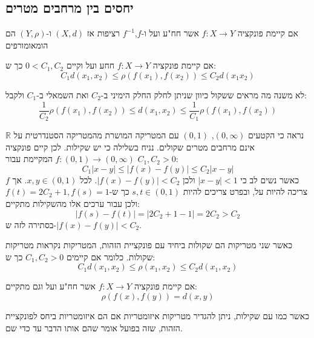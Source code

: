 \documentclass{tstextbook}
\begin{document}
\subsection{יחסים בין מרחבים מטרים}

\begin{definition}[הומאומורפיזם]
אם קיימת פונקציה \(f:X\to Y\) אשר חח"ע ועל ו-\(f\),\(f^{-1}\) רציפות אז \((X,d)\) ו-\((Y,\rho)\) הם הומאומורפים

\end{definition}
\begin{definition}[שקילות]
אם קיימת פונקציה \(f:X\to Y\) חחע ועל וקיים \(0<C_{1},C_{2}\) כך ש:
$$C_{1}d(x_{1},x_{2})\leq \rho(f(x_{1}),f(x_{2}))\leq C_{2}d(x_{1}x_{2})
$$

\end{definition}
\begin{remark}
לא משנה מה מראים ששקול כיוון שניתן לחלק החלק הימיני ב-\(C_{2}\) ואת השמאלי ב-\(C_{1}\) ולקבל:
$$\frac{1}{C_{2}}\rho(f(x_{1}),f(x_{2}))\leq d(x_{1},x_{2})\leq \frac{1}{C_{1}}\rho(f(x_{1}),f(x_{2}))$$

\end{remark}
\begin{example}
נראה כי הקטעים \(\left( 0,\infty \right)\), \((0,1)\) עם המטריקה המושרת מהמטריקה הסטנדרטית על \(\mathbb{R}\) אינם מרחבים מטרים שקולים. נניח בשלילה כי יש שקילות. לכן קיים פונקציה \(f:(0,1)\to\left( 0,\infty \right)\) המקיימת עבור \(C_{1},C_{2}>0\):
$$C_{1}|x-y|\leq|f(x)-f(y)|\leq C_{2}|x-y|$$
כאשר נשים לב כי \(|x-y|<1\) ולכן \(|f(x)-f(y)|<C_{2}\). לכל \(x,y\in(0,1)\). אך \(f\) צריכה להיות על, ובפרט צריכים להיות \(s,t\in(0,1)\) כך ש-\(f(t)=2C_{2}+1,f(s)=1\) ולכן עבור ערכים אלו מהשקילות מתקיים:
$$|f(s)-f(t)|=|2C_{2}+1-1|=2C_{2}>C_{2}$$
בסתירה לזה ש-\(|f(x)-f(y)|<C_{2}\).

\end{example}
\begin{definition}
כאשר שני מטריקות הם שקולות ביחיד עם פונקציית הזהות, המטריקות נקראות מטריקות שקולות. כלומר אם קיימים \(C_{1},C_{2}>0\) כך ש:
$$C_{1}d(x_{1},x_{2})\leq \rho(x_{1},x_{2})\leq C_{2}d(x_{1},x_{2})$$

\end{definition}
\begin{definition}[איזומטריה]
אם קיימת פונקציה \(f:X\to Y\) אשר חח"ע ועל וגם מתקיים:
$$\rho(f(x),f(y))=d(x,y)$$

\end{definition}
כאשר כמו עם שקילות, ניתן להגדיר מטריקות איזומטריות אם הם איזומטריות ביחס לפונקציית הזהות, שזה בפועל אומר שהם אותו הדבר עד כדי שם.
\end{document}
